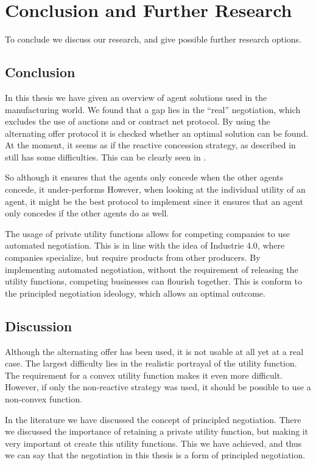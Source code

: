 \chapter{Conclusion and Further Research}
To conclude we discuss our research, and give possible further research options.
\section{Conclusion}
In this thesis we have given an overview of agent solutions used in the manufacturing world. We found that a gap lies in the ``real'' negotiation, which excludes the use of auctions and or contract net protocol. By using the alternating offer protocol it is checked whether an optimal solution can be found. At the moment, it seems as if the reactive concession strategy, as described in \citet{zheng2015automated} still has some difficulties. This can be clearly seen in . 

So although it ensures that the agents only concede when the other agents concede, it under-performs However, when looking at the individual utility of an agent, it might be the best protocol to implement since it ensures that an agent only concedes if the other agents do as well.

The usage of private utility functions allows for competing companies to use automated negotiation. This is in line with the idea of Industrie 4.0, where companies specialize, but require products from other  producers. By implementing automated negotiation, without the requirement of releasing the utility functions, competing businesses can flourish together. This is conform to the principled negotiation ideology, which allows an optimal outcome.

\section{Discussion}
Although the alternating offer has been used, it is not usable at all yet at a real case. The largest difficulty lies in the realistic portrayal of the utility function. The requirement for a convex utility function makes it even more difficult. However, if only the non-reactive strategy was used, it should be possible to use a non-convex function.

In the literature we have discussed the concept of principled negotiation. There we discussed the importance of retaining a private utility function, but making it very important ot create this utility functions. This we have achieved, and thus we can say that the negotiation in this thesis is a form of principled negotiation.

